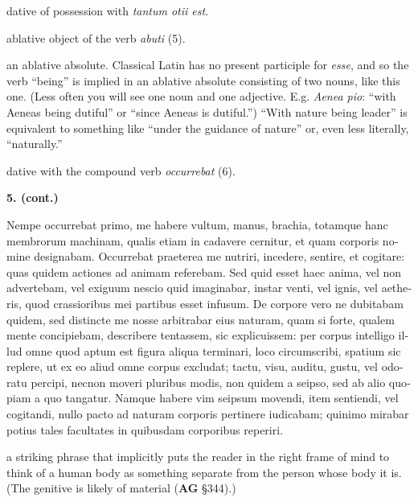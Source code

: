  dative of possession with \textit{tantum otii est}.

 ablative object of the verb \textit{abuti} (5).

 an ablative absolute. Classical Latin has no present participle for \textit{esse}, and so the verb ``being'' is implied in an ablative absolute consisting of two nouns, like this one. (Less often you will see one noun and one adjective. E.g. \textit{Aenea pio}: ``with Aeneas being dutiful'' or ``since Aeneas is dutiful.'') ``With nature being leader'' is equivalent to something like ``under the guidance of nature'' or, even less literally, ``naturally.''

 dative with the compound verb \textit{occurrebat} (6).

\clearpage

\beginnumbering
\pstart
{}
    \textbf{5. (cont.)} \begin{latin}Nempe occurrebat primo, me habere vultum, manus, brachia, totamque hanc membrorum machinam, qualis etiam in cadavere cernitur, et quam corporis nomine designabam. Occurrebat praeterea me nutriri, incedere, sentire, et cogitare: quas quidem actiones ad animam referebam. Sed quid esset haec anima, vel non advertebam, vel exiguum nescio quid imaginabar, instar venti, vel ignis, vel aetheris, quod crassioribus mei partibus esset infusum. De corpore vero ne dubitabam quidem, sed distincte me nosse arbitrabar eius naturam, quam si forte, qualem mente concipiebam, describere tentassem, sic explicuissem: per corpus intelligo illud omne quod aptum est figura aliqua terminari, loco circumscribi, spatium sic replere, ut ex eo aliud omne corpus excludat; tactu, visu, auditu, gustu, vel odoratu percipi, necnon moveri pluribus modis, non quidem a seipso, sed ab alio quopiam a quo tangatur. Namque habere vim seipsum movendi, item sentiendi, vel cogitandi, nullo pacto ad naturam corporis pertinere iudicabam; quinimo mirabar potius tales facultates in quibusdam corporibus reperiri.\end{latin}
\pend
\endnumbering

\prenotes

 a striking phrase that implicitly puts the reader in the right frame of mind to think of a human body as something separate from the person whose body it is. (The genitive is likely of material (\textbf{AG} §344).)

